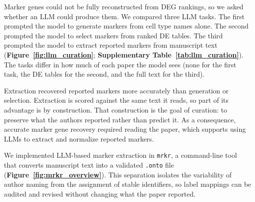 \documentclass[10pt,twocolumn]{article}
\theoremstyle{plain}
\theoremstyle{definition}
\theoremstyle{remark}
\begin{document}
Marker genes could not be fully reconstructed from DEG rankings, so we asked whether an LLM could produce them. We compared three LLM tasks. The first prompted the model to generate markers from cell type names alone. The second prompted the model to select markers from ranked DE tables. The third prompted the model to extract reported markers from manuscript text (\textbf{Figure~\ref{fig:llm_curation}}; \textbf{Supplementary Table~\ref{tab:llm_curation}}). The tasks differ in how much of each paper the model sees (none for the first task, the DE tables for the second, and the full text for the third).

Extraction recovered reported markers more accurately than generation or selection.    Extraction is scored against the same text it reads, so part of its advantage is by construction. That construction is the goal of curation: to preserve what the authors reported rather than predict it. As a consequence, accurate marker gene recovery required reading the paper, which supports using LLMs to extract and normalize reported markers.

We implemented LLM-based marker extraction in \texttt{mrkr}, a command-line tool that converts manuscript text into a validated \texttt{.onto} file (\textbf{Figure~\ref{fig:mrkr_overview}}).  This separation isolates the variability of author naming from the assignment of stable identifiers, so label mappings can be audited and revised without changing what the paper reported.
\end{document}
